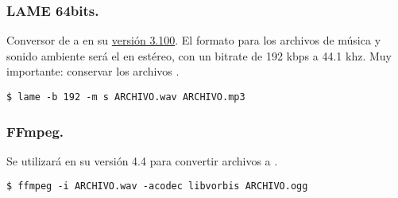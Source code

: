 \subsubsection{LAME 64bits.}
Conversor de  a  en su \href{https://lame.sourceforge.io/download.php}{versión 3.100}. El formato para los archivos de música y sonido ambiente será el  en estéreo, con un bitrate de 192 kbps a 44.1 khz. Muy importante: conservar los archivos .

\begin{lstlisting}
$ lame -b 192 -m s ARCHIVO.wav ARCHIVO.mp3
\end{lstlisting}

\subsubsection{FFmpeg.}
Se utilizará en su versión 4.4 para convertir archivos  a .

\begin{lstlisting}
$ ffmpeg -i ARCHIVO.wav -acodec libvorbis ARCHIVO.ogg
\end{lstlisting}